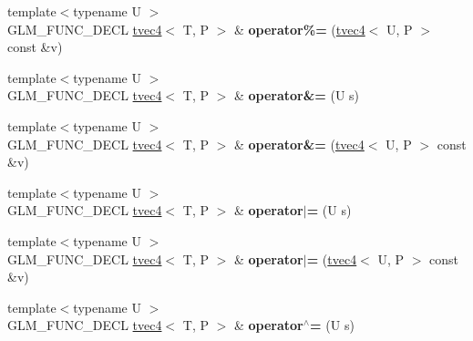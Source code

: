 \begin{DoxyCompactItemize}
\item 
\hypertarget{structglm_1_1detail_1_1tvec4_a9ab6bbc0aa973f884a5d4e95230fddba}{{\footnotesize template$<$typename U $>$ }\\G\-L\-M\-\_\-\-F\-U\-N\-C\-\_\-\-D\-E\-C\-L \hyperlink{structglm_1_1detail_1_1tvec4}{tvec4}$<$ T, P $>$ \& {\bfseries operator\%=} (\hyperlink{structglm_1_1detail_1_1tvec4}{tvec4}$<$ U, P $>$ const \&v)}\label{structglm_1_1detail_1_1tvec4_a9ab6bbc0aa973f884a5d4e95230fddba}

\item 
\hypertarget{structglm_1_1detail_1_1tvec4_a4b82149d9b97976d59c763ae1e9a2ad9}{{\footnotesize template$<$typename U $>$ }\\G\-L\-M\-\_\-\-F\-U\-N\-C\-\_\-\-D\-E\-C\-L \hyperlink{structglm_1_1detail_1_1tvec4}{tvec4}$<$ T, P $>$ \& {\bfseries operator\&=} (U s)}\label{structglm_1_1detail_1_1tvec4_a4b82149d9b97976d59c763ae1e9a2ad9}

\item 
\hypertarget{structglm_1_1detail_1_1tvec4_a5d0cba98ee74428170a8be161735f0e4}{{\footnotesize template$<$typename U $>$ }\\G\-L\-M\-\_\-\-F\-U\-N\-C\-\_\-\-D\-E\-C\-L \hyperlink{structglm_1_1detail_1_1tvec4}{tvec4}$<$ T, P $>$ \& {\bfseries operator\&=} (\hyperlink{structglm_1_1detail_1_1tvec4}{tvec4}$<$ U, P $>$ const \&v)}\label{structglm_1_1detail_1_1tvec4_a5d0cba98ee74428170a8be161735f0e4}

\item 
\hypertarget{structglm_1_1detail_1_1tvec4_a9841c9154372e67d5d6e0b459848ca86}{{\footnotesize template$<$typename U $>$ }\\G\-L\-M\-\_\-\-F\-U\-N\-C\-\_\-\-D\-E\-C\-L \hyperlink{structglm_1_1detail_1_1tvec4}{tvec4}$<$ T, P $>$ \& {\bfseries operator$\vert$=} (U s)}\label{structglm_1_1detail_1_1tvec4_a9841c9154372e67d5d6e0b459848ca86}

\item 
\hypertarget{structglm_1_1detail_1_1tvec4_a6e487f3a13cff94c633d2f4961f8d82a}{{\footnotesize template$<$typename U $>$ }\\G\-L\-M\-\_\-\-F\-U\-N\-C\-\_\-\-D\-E\-C\-L \hyperlink{structglm_1_1detail_1_1tvec4}{tvec4}$<$ T, P $>$ \& {\bfseries operator$\vert$=} (\hyperlink{structglm_1_1detail_1_1tvec4}{tvec4}$<$ U, P $>$ const \&v)}\label{structglm_1_1detail_1_1tvec4_a6e487f3a13cff94c633d2f4961f8d82a}

\item 
\hypertarget{structglm_1_1detail_1_1tvec4_ade267c789e5e2fa64194f676fbede6d3}{{\footnotesize template$<$typename U $>$ }\\G\-L\-M\-\_\-\-F\-U\-N\-C\-\_\-\-D\-E\-C\-L \hyperlink{structglm_1_1detail_1_1tvec4}{tvec4}$<$ T, P $>$ \& {\bfseries operator$^\wedge$=} (U s)}\label{structglm_1_1detail_1_1tvec4_ade267c789e5e2fa64194f676fbede6d3}


\end{DoxyCompactItemize}
